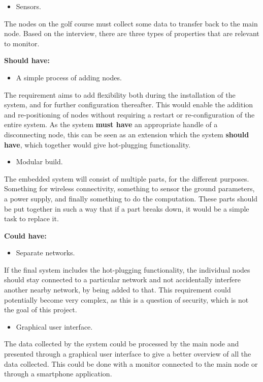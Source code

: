 \begin{itemize}
\item Sensors.
\end{itemize}
The nodes on the golf course must collect some data to transfer back to the main node. Based on the interview, there are three types of properties that are relevant to monitor.


\textbf{Should have:}
\begin{itemize}
\item A simple process of adding nodes.
\end{itemize}
The requirement aims to add flexibility both during the installation of the system, and for further configuration thereafter. This would enable the addition and re-positioning of nodes without requiring a restart or re-configuration of the entire system. As the system \textbf{must have} an appropriate handle of a disconnecting node, this can be seen as an extension which the system \textbf{should have}, which together would give hot-plugging functionality.


\begin{itemize}
\item Modular build.
\end{itemize}
The embedded system will consist of multiple parts, for the different purposes. Something for wireless connectivity, something to sensor the ground parameters, a power supply, and finally something to do the computation. These parts should be put together in such a way that if a part breaks down, it would be a simple task to replace it. 


\textbf{Could have:}
\begin{itemize}
\item Separate networks.
\end{itemize}
If the final system includes the hot-plugging functionality, the individual nodes should stay connected to a particular network and not accidentally interfere another nearby network, by being added to that. This requirement could potentially become very complex, as this is a question of security, which is not the goal of this project. 

\begin{itemize}
\item Graphical user interface.
\end{itemize}
The data collected by the system could be processed by the main node and presented through a graphical user interface to give a better overview of all the data collected. This could be done with a monitor connected to the main node or through a smartphone application.







